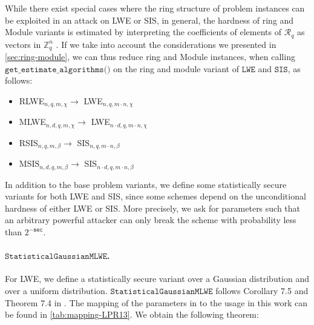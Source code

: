 While there exist special cases where the ring structure of problem instances can be exploited in an attack on LWE or SIS, %
in general, the hardness of ring and Module variants is estimated by interpreting the coefficients of elements of $\mathcal{R}_q$ as vectors in $\mathbb{Z}_q^n$ \cite{ACDDPPVW18}. If we take into account the considerations we presented in \cref{sec:ring-module}, we can thus reduce ring and Module instances, when calling $\texttt{get\_estimate\_algorithms()}$ on the ring and module variant of $\texttt{LWE}$ and $\texttt{SIS}$, as follows:
\begin{itemize}
    \item RLWE$_{n, q, m, \chi} \longrightarrow$ LWE$_{n, q, m \cdot n, \chi}$
    \item MLWE$_{n, d, q, m, \chi} \longrightarrow$ LWE$_{n \cdot d, q, m \cdot n, \chi}$
    \item RSIS$_{n, q, m, \beta} \longrightarrow$ SIS$_{n, q, m \cdot n, \beta}$
    \item MSIS$_{n, d, q, m, \beta} \longrightarrow$ SIS$_{n \cdot d, q, m \cdot n, \beta}$
\end{itemize}


In addition to the base problem variants, we define some statistically secure variants for both LWE and SIS, since some schemes depend on the unconditional hardness of either LWE or SIS. More precisely, we ask for parameters such that an arbitrary powerful attacker can only break the scheme with probability less than $2^{-\texttt{sec}}$.

\paragraph{$\texttt{StatisticalGaussianMLWE}$.} For LWE, we define a statistically secure variant over a Gaussian distribution and over a uniform distribution. $\texttt{StatisticalGaussianMLWE}$ follows Corollary 7.5 and Theorem 7.4 in \cite{LPR13}. The mapping of the parameters in \cite{LPR13} to the usage in this work can be found in \cref{tab:mapping-LPR13}. We obtain the following theorem:

